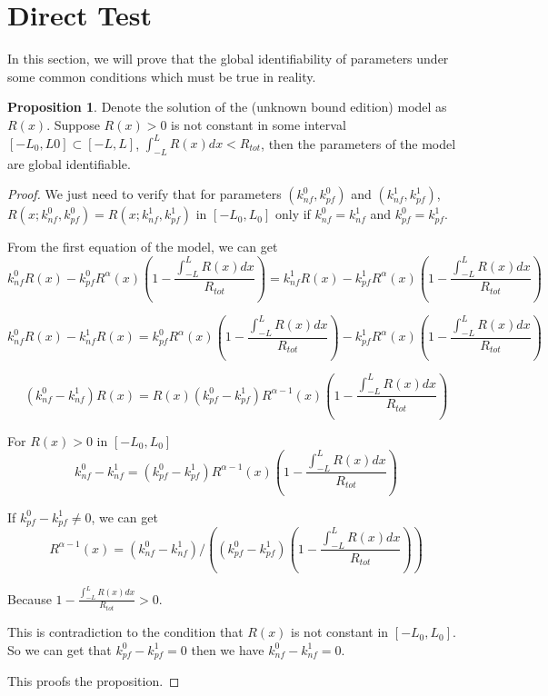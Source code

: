 \documentclass[12pt]{extarticle}
\begin{document}
\section{Direct Test}
\label{sect:DirectTest}

In this section, we will prove that the global identifiability of parameters under some common conditions which must be true in reality.

\theoremstyle{definition} \newtheorem{proposition}{Proposition}

\begin{proposition} \label{proposition:box}
 Denote the solution of the (unknown bound edition) model as $R(x)$. Suppose $R(x)>0$ is not constant in some interval $[-L_{0},L{0}]\subset[-L,L]$, $\int_{-L}^{L}R(x)dx<R_{tot}$, then the parameters of the model are global identifiable. 
\end{proposition}

\begin{proof}
We just need to verify that for parameters $(k_{nf}^{0},k_{pf}^{0})$ and $(k_{nf}^{1},k_{pf}^{1})$, $R(x;k_{nf}^{0},k_{pf}^{0})=R(x;k_{nf}^{1},k_{pf}^{1})$ in $[-L_{0},L_{0}]$ only if $k_{nf}^{0}=k_{nf}^{1}$ and $k_{pf}^{0}=k_{pf}^{1}$.

From the first equation of the model, we can get
\begin{equation*}
k_{nf}^{0}R(x)-k_{pf}^{0}R^{\alpha}(x)\left(1-\frac{\int_{-L}^{L}R(x)dx}{R_{tot}}\right)=k_{nf}^{1}R(x)-k_{pf}^{1}R^{\alpha}(x)\left(1-\frac{\int_{-L}^{L}R(x)dx}{R_{tot}}\right)
\end{equation*}

\begin{equation*}
k_{nf}^{0}R(x)-k_{nf}^{1}R(x)=k_{pf}^{0}R^{\alpha}(x)\left(1-\frac{\int_{-L}^{L}R(x)dx}{R_{tot}}\right)-k_{pf}^{1}R^{\alpha}(x)\left(1-\frac{\int_{-L}^{L}R(x)dx}{R_{tot}}\right)
\end{equation*}

\begin{equation*}
(k_{nf}^{0}-k_{nf}^{1})R(x)=R(x)(k_{pf}^{0}-k_{pf}^{1})R^{\alpha-1}(x)\left(1-\frac{\int_{-L}^{L}R(x)dx}{R_{tot}}\right)
\end{equation*}

For $R(x)>0$ in $[-L_{0},L_{0}]$
\begin{equation*}
k_{nf}^{0}-k_{nf}^{1}=(k_{pf}^{0}-k_{pf}^{1})R^{\alpha-1}(x)\left(1-\frac{\int_{-L}^{L}R(x)dx}{R_{tot}}\right)
\end{equation*}

If $k_{pf}^{0}-k_{pf}^{1}\ne{}0$, we can get
\begin{equation*}
R^{\alpha-1}(x)=(k_{nf}^{0}-k_{nf}^{1})/\left((k_{pf}^{0}-k_{pf}^{1})\left(1-\frac{\int_{-L}^{L}R(x)dx}{R_{tot}}\right)\right)
\end{equation*}

Because $1-\frac{\int_{-L}^{L}R(x)dx}{R_{tot}}>0$.

This is contradiction to the condition that $R(x)$ is not constant in $[-L_{0},L_{0}]$. So we can get that $k_{pf}^{0}-k_{pf}^{1}=0$ then we have $k_{nf}^{0}-k_{nf}^{1}=0$.


This proofs the proposition. 


\end{proof}
\end{document}
